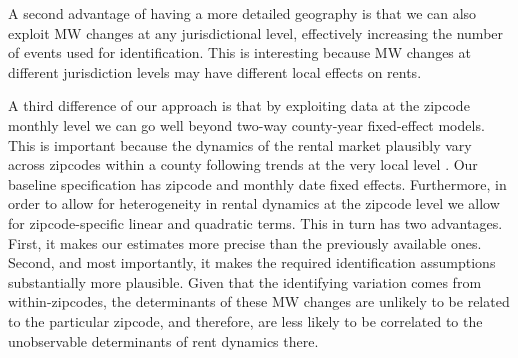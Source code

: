 
A second advantage of having a more detailed geography is that we can also exploit MW changes at any 
jurisdictional level, effectively increasing the number of events used for identification. This is 
interesting because MW changes at different jurisdiction levels may have different local effects on 
rents.


A third difference of our approach is that by exploiting data at the zipcode monthly level we can go 
well beyond two-way county-year fixed-effect models. This is important because the dynamics of the 
rental market plausibly vary across zipcodes within a county following trends at the very local level 
\parencite{almagro2019location}. Our baseline specification has zipcode and monthly date fixed 
effects. Furthermore, in order to allow for heterogeneity in rental dynamics at the zipcode level we 
allow for zipcode-specific linear and quadratic terms. This in turn has two advantages. First, it 
makes our estimates more precise than the previously available ones. Second, and most importantly, it 
makes the required identification assumptions substantially more plausible. Given that the identifying 
variation comes from within-zipcodes, the determinants of these MW changes are unlikely to be related 
to the particular zipcode, and therefore, are less likely to be correlated to the unobservable 
determinants of rent dynamics there.

